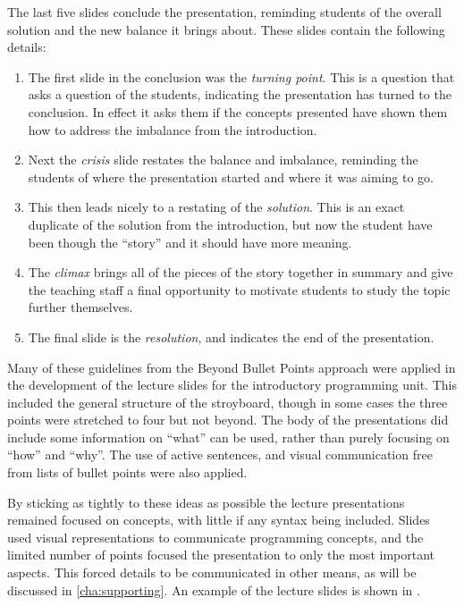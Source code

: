 The last five slides conclude the presentation, reminding students of the overall solution and the new balance it brings about. These slides contain the following details:
\begin{enumerate}
	\item The first slide in the conclusion was the \emph{turning point}. This is a question that asks a question of the students, indicating the presentation has turned to the conclusion. In effect it asks them if the concepts presented have shown them how to address the imbalance from the introduction.
	\item Next the \emph{crisis} slide restates the balance and imbalance, reminding the students of where the presentation started and where it was aiming to go.
	\item This then leads nicely to a restating of the \emph{solution}. This is an exact duplicate of the solution from the introduction, but now the student have been though the ``story'' and it should have more meaning.
	\item The \emph{climax} brings all of the pieces of the story together in summary and give the teaching staff a final opportunity to motivate students to study the topic further themselves.
	\item The final slide is the \emph{resolution}, and indicates the end of the presentation.
\end{enumerate}

Many of these guidelines from the Beyond Bullet Points approach were applied in the development of the lecture slides for the introductory programming unit. This included the general structure of the stroyboard, though in some cases the three points were stretched to four but not beyond. The body of the presentations did include some information on ``what'' can be used, rather than purely focusing on ``how'' and ``why''. The use of active sentences, and visual communication free from lists of bullet points were also applied.

By sticking as tightly to these ideas as possible the lecture presentations remained focused on concepts, with little if any syntax being included. Slides used visual representations to communicate programming concepts, and the limited number of points focused the presentation to only the most important aspects. This forced details to be communicated in other means, as will be discussed in \cref{cha:supporting}. An example of the lecture slides is shown in .

